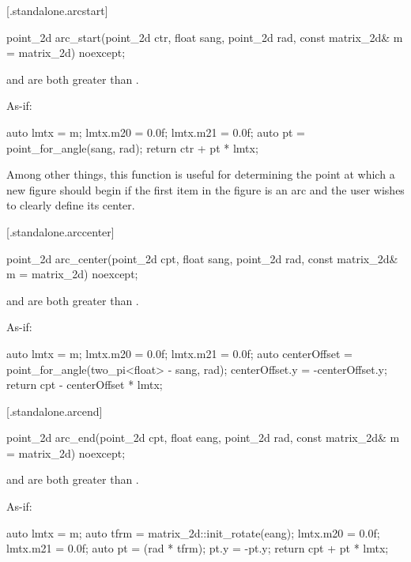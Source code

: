  [\iotwod.standalone.arcstart] {}

%
\begin{itemdecl}
point_2d arc_start(point_2d ctr, float sang, point_2d rad, 
  const matrix_2d& m = matrix_2d{}) noexcept;
\end{itemdecl}
\begin{itemdescr}
\pnum
\requires
{} and  are both greater than .

\pnum
\returns
As-if:
\begin{codeblock}
auto lmtx = m;
lmtx.m20 = 0.0f; lmtx.m21 = 0.0f;
auto pt = point_for_angle(sang, rad);
return ctr + pt * lmtx;
\end{codeblock}

\pnum
\begin{note}
Among other things, this function is useful for determining the point at which a new figure should begin if the first item in the figure is an arc and the user wishes to clearly define its center.
\end{note}
\end{itemdescr}

 [\iotwod.standalone.arccenter] {}

%
\begin{itemdecl}
point_2d arc_center(point_2d cpt, float sang, point_2d rad, 
  const matrix_2d& m = matrix_2d{}) noexcept;
\end{itemdecl}
\begin{itemdescr}
\pnum
\requires
{} and  are both greater than .

\pnum
\returns
As-if:
\begin{codeblock}
auto lmtx = m;
lmtx.m20 = 0.0f; lmtx.m21 = 0.0f;
auto centerOffset = point_for_angle(two_pi<float> - sang, rad);
centerOffset.y = -centerOffset.y;
return cpt - centerOffset * lmtx;
\end{codeblock}
\end{itemdescr}

 [\iotwod.standalone.arcend] {}

%
\begin{itemdecl}
point_2d arc_end(point_2d cpt, float eang, point_2d rad, 
  const matrix_2d& m = matrix_2d{}) noexcept;
\end{itemdecl}
\begin{itemdescr}
\pnum
\requires
{} and  are both greater than .

\pnum
\returns
As-if:
\begin{codeblock}
auto lmtx = m;
auto tfrm = matrix_2d::init_rotate(eang);
lmtx.m20 = 0.0f; lmtx.m21 = 0.0f;
auto pt = (rad * tfrm);
pt.y = -pt.y;
return cpt + pt * lmtx;
\end{codeblock}
\end{itemdescr}
